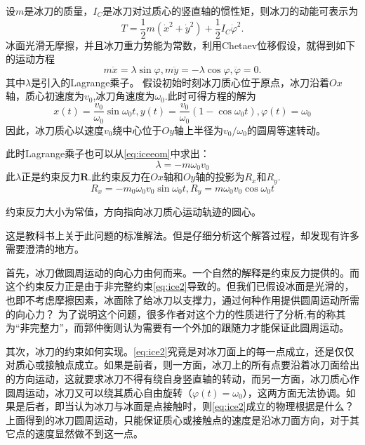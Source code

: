 \documentclass{ctexart}
\begin{document}
设$m$是冰刀的质量，$I_C$是冰刀对过质心的竖直轴的惯性矩，则冰刀的动能可表示为
\begin{equation}
  \label{eq:ice3}
  T = \frac{1}{2}m\left(\dot{x}^2+\dot{y}^2\right)+\frac{1}{2}I_C\dot{\varphi}^2.
\end{equation}
冰面光滑无摩擦，并且冰刀重力势能为常数，利用Chetaev位移假设，就得到如下的运动方程
\begin{equation}
  \label{eq:iceeom}
  m \ddot{x} = \lambda \sin\varphi, m \ddot{y} = -\lambda \cos\varphi, \ddot{\varphi} = 0.
\end{equation}
其中$\lambda$是引入的Lagrange乘子。
假设初始时刻冰刀质心位于原点，冰刀沿着$Ox$轴，质心初速度为$v_0$,冰刀角速度为$\omega_0$.此时可得方程的解为
\begin{equation}
  \label{eq:icesol}
  x(t) = \frac{v_0}{\omega_0}\sin\omega_0t, y(t) = \frac{v_0}{\omega_0}(1 - \cos\omega_0t), \varphi(t) = \omega_0
\end{equation}
因此，冰刀质心以速度$v_0$绕中心位于$Oy$轴上半径为$v_0/\omega_0$的圆周等速转动。

此时Lagrange乘子也可以从\eqref{eq:iceeom}中求出：
\begin{equation}
  \label{eq:icel}
 \lambda = -m\omega_0v_0
\end{equation}
此$\lambda$正是约束反力$\mathbf{R}$.此约束反力在$Ox$轴和$Oy$轴的投影为$R_x$和$R_y$.
\begin{equation}
  \label{eq:icecon}
  R_x = -m_0\omega_0v_0\sin\omega_0t, R_y = m \omega_0v_0\cos\omega_0t
\end{equation}

约束反力大小为常值，方向指向冰刀质心运动轨迹的圆心。

这是教科书上关于此问题的标准解法。但是仔细分析这个解答过程，却发现有许多需要澄清的地方。

首先，冰刀做圆周运动的向心力由何而来。一个自然的解释是约束反力提供的。而这个约束反力正是由于非完整约束\eqref{eq:ice2}导致的。但我们已假设冰面是光滑的，也即不考虑摩擦因素，冰面除了给冰刀以支撑力，通过何种作用提供圆周运动所需的向心力？
为了说明这个问题，很多作者对这个力的性质进行了分析,有的称其为“非完整力”，而郭仲衡则认为需要有一个外加的跟随力才能保证此圆周运动。

其次，冰刀的约束如何实现。\eqref{eq:ice2}究竟是对冰刀面上的每一点成立，还是仅仅对质心或接触点成立。如果是前者，则一方面，冰刀上的所有点要沿着冰刀面给出的方向运动，这就要求冰刀不得有绕自身竖直轴的转动，而另一方面，冰刀质心作圆周运动，冰刀又可以绕其质心自由旋转（$\varphi(t)=\omega_0$），这两方面无法协调。如果是后者，即当认为冰刀与冰面是点接触时，则\eqref{eq:ice2}成立的物理根据是什么？上面得到的冰刀圆周运动，只能保证质心或接触点的速度是沿冰刀面方向，对于其它点的速度显然做不到这一点。
\end{document}
